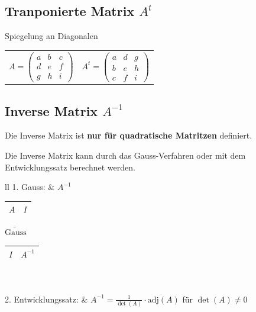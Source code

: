 \subsection[Tranponierte Matrix]{Tranponierte Matrix $A^t$}

Spiegelung an Diagonalen 

\vspace{0.2cm}

\begin{tabular}{ll}
	$A=
	\begin{pmatrix}
		a&b&c\\
		d&e&f\\
		g&h&i
	\end{pmatrix}$ &
	$ A^t =
	\begin{pmatrix}
		a&d&g\\
		b&e&h\\
		c&f&i
	\end{pmatrix}$ 
\end{tabular}
			

\subsection[Inverse Matrix]{Inverse Matrix $A^{-1}$}

Die Inverse Matrix ist \textbf{nur für quadratische Matritzen} definiert.

Die Inverse Matrix kann durch das Gauss-Verfahren oder mit dem Entwicklungssatz berechnet werden.

\begin{tabular}{ll}
	1. Gauss: & 
	$A^{-1}$ \quad 
	\begin{tabular}{|c|c|}
		\hline
			$A$ & $I$ \\
		\hline
	\end{tabular} 
	\quad $\underrightarrow{\text{Gauss}}$ \quad 
	\begin{tabular}{|c|c|}
	\hline
		$I$ & $A^{-1}$ \\
	\hline
	\end{tabular} 
	\\
	\\
	2. Entwicklungssatz: &
	$A^{-1} = \frac{1}{\det(A)} \cdot \mathrm{adj}(A)$ \quad für $\det(A) \neq 0$
\end{tabular}



